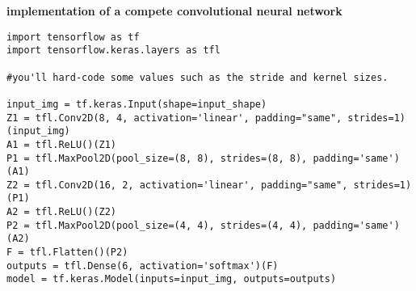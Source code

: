 \documentclass{article}
\begin{document}
\newpage
\noindent
\textbf{implementation of a compete convolutional neural network}
\begin{lstlisting}
import tensorflow as tf
import tensorflow.keras.layers as tfl

#you'll hard-code some values such as the stride and kernel sizes.

input_img = tf.keras.Input(shape=input_shape)
Z1 = tfl.Conv2D(8, 4, activation='linear', padding="same", strides=1)(input_img)
A1 = tfl.ReLU()(Z1)
P1 = tfl.MaxPool2D(pool_size=(8, 8), strides=(8, 8), padding='same')(A1)
Z2 = tfl.Conv2D(16, 2, activation='linear', padding="same", strides=1)(P1)
A2 = tfl.ReLU()(Z2)
P2 = tfl.MaxPool2D(pool_size=(4, 4), strides=(4, 4), padding='same')(A2)
F = tfl.Flatten()(P2)
outputs = tfl.Dense(6, activation='softmax')(F)
model = tf.keras.Model(inputs=input_img, outputs=outputs)

\end{lstlisting}
\end{document}
